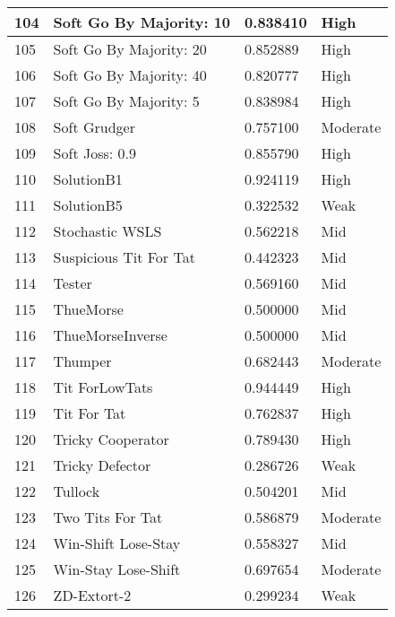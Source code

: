 \begin{longtable}{|p{0.5cm}||p{6cm}||p{4cm}||p{2cm}|}
			104 & Soft Go By Majority: 10     & 0.838410          & High     \\ \hline
			105 & Soft Go By Majority: 20     & 0.852889          & High     \\ \hline
			106 & Soft Go By Majority: 40     & 0.820777          & High     \\ \hline
			107 & Soft Go By Majority: 5      & 0.838984          & High     \\ \hline
			108 & Soft Grudger                & 0.757100          & Moderate \\ \hline
			109 & Soft Joss: 0.9              & 0.855790          & High     \\ \hline
			110 & SolutionB1                  & 0.924119          & High     \\ \hline
			111 & SolutionB5                  & 0.322532          & Weak     \\ \hline
			112 & Stochastic WSLS             & 0.562218          & Mid     \\ \hline
			113 & Suspicious Tit For Tat      & 0.442323          & Mid     \\ \hline
			114 & Tester                      & 0.569160          & Mid     \\ \hline
			115 & ThueMorse                   & 0.500000          & Mid     \\ \hline
			116 & ThueMorseInverse            & 0.500000          & Mid     \\ \hline
			117 & Thumper                     & 0.682443          & Moderate \\ \hline
			118 & Tit ForLowTats              & 0.944449          & High     \\ \hline
			119 & Tit For Tat                 & 0.762837          & High     \\ \hline
			120 & Tricky Cooperator           & 0.789430          & High     \\ \hline
			121 & Tricky Defector             & 0.286726          & Weak     \\ \hline
			122 & Tullock                     & 0.504201          & Mid     \\ \hline
			123 & Two Tits For Tat            & 0.586879          & Moderate \\ \hline
			124 & Win-Shift Lose-Stay         & 0.558327          & Mid     \\ \hline
			125 & Win-Stay Lose-Shift         & 0.697654          & Moderate \\ \hline
			126 & ZD-Extort-2                 & 0.299234          & Weak     \\ \hline

\end{longtable}
